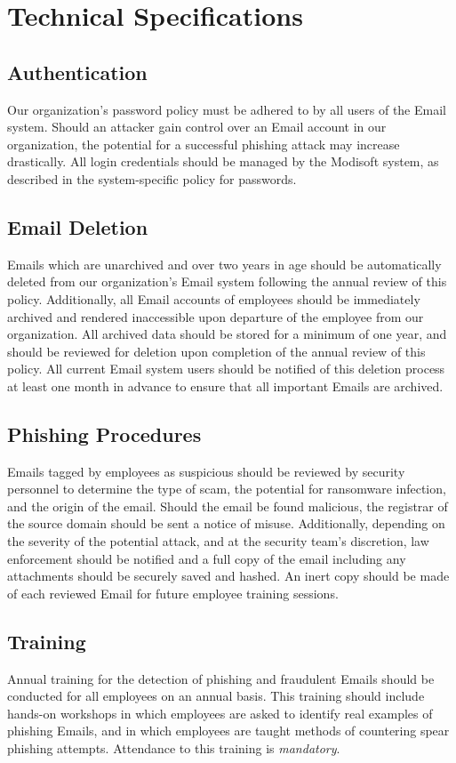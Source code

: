 \documentclass[11pt]{article}
\begin{document}
\section{Technical Specifications}
\label{sec:orgcd12198}
\subsection{Authentication}
\label{sec:orga6b426c}
Our organization's password policy must be adhered to by all users of the Email system. Should an attacker gain control over an Email account in our organization, the potential for a successful phishing attack may increase drastically. All login credentials should be managed by the Modisoft system, as described in the system-specific policy for passwords.

\subsection{Email Deletion}
\label{sec:org08198eb}
Emails which are unarchived and over two years in age should be automatically deleted from our organization's Email system following the annual review of this policy. Additionally, all Email accounts of employees should be immediately archived and rendered inaccessible upon departure of the employee from our organization. All archived data should be stored for a minimum of one year, and should be reviewed for deletion upon completion of the annual review of this policy. All current Email system users should be notified of this deletion process at least one month in advance to ensure that all important Emails are archived.

\subsection{Phishing Procedures}
\label{sec:orge927c85}
Emails tagged by employees as suspicious should be reviewed by security personnel to determine the type of scam, the potential for ransomware infection, and the origin of the email. Should the email be found malicious, the registrar of the source domain should be sent a notice of misuse. Additionally, depending on the severity of the potential attack, and at the security team's discretion, law enforcement should be notified and a full copy of the email including any attachments should be securely saved and hashed. An inert copy should be made of each reviewed Email for future employee training sessions.

\subsection{Training}
\label{sec:orgc9dfe10}
Annual training for the detection of phishing and fraudulent Emails should be conducted for all employees on an annual basis. This training should include hands-on workshops in which employees are asked to identify real examples of phishing Emails, and in which employees are taught methods of countering spear phishing attempts. Attendance to this training is \emph{mandatory}.
\end{document}
